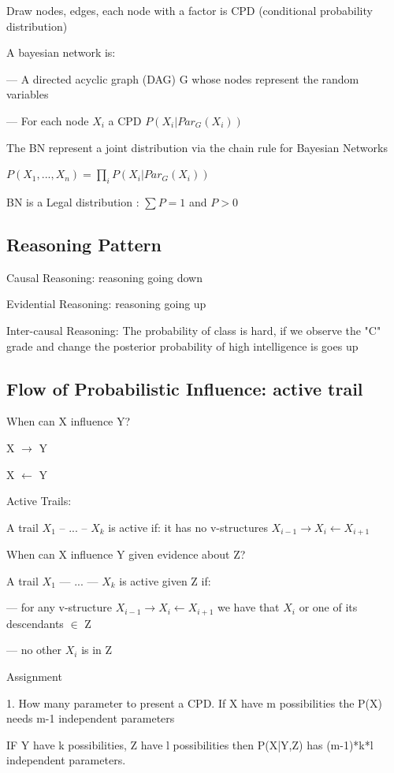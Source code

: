 \documentclass{book}
\begin{document}
Draw nodes, edges, each node with a factor is CPD (conditional probability distribution)

A bayesian network is:

--- A directed acyclic graph (DAG) G whose nodes represent the random variables

--- For each node $X_i$ a CPD $P(X_i|Par_G(X_i))$

The BN represent a joint distribution via the chain rule for Bayesian Networks

$P(X_1,...,X_n) = \prod_{i} P(X_i|Par_G(X_i))$

BN is a Legal distribution : $\sum P=1$ and $P>0$

\subsection{Reasoning Pattern}
Causal Reasoning: reasoning going down

Evidential Reasoning: reasoning going up

Inter-causal Reasoning: The probability of class is hard, if we observe the "C" grade and change the posterior probability of high intelligence is goes up

\subsection{Flow of Probabilistic Influence: active trail}
When can X influence Y?

X $\rightarrow$ Y

X $\leftarrow$ Y

Active Trails: 

A trail $X_1$ -- ... -- $X_k$ is active if: it has no v-structures $X_{i-1} \rightarrow X_i \leftarrow X_{i+1}$

When can X influence Y given evidence about Z?

A trail $X_1$ --- ... --- $X_k$ is active given Z if:

--- for any v-structure $X_{i-1} \rightarrow X_i \leftarrow X_{i+1} $ we have that $X_i$ or one of its descendants $\in$ Z

--- no other $X_i$ is in Z

Assignment

1. How many parameter to present a CPD. If X have m possibilities the P(X) needs m-1 independent parameters

IF Y have k possibilities, Z have l possibilities then P(X|Y,Z) has (m-1)*k*l independent parameters.
\end{document}
